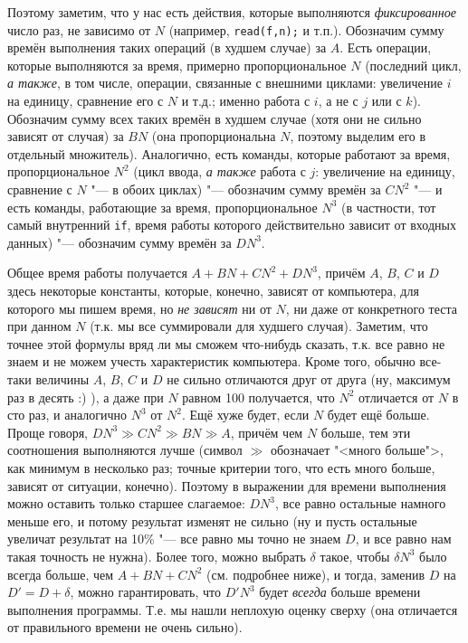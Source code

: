 {Поэтому заметим, что у нас есть действия, которые выполняются 
\textit{фиксированное} число раз, не зависимо от $N$ (например, 
\verb|read(f,n);| и т.п.). Обозначим сумму времён выполнения таких операций (в 
худшем случае) за $A$. Есть операции, которые выполняются за время, примерно 
пропорциональное $N$ (последний цикл, \textit{а также}, в том числе, операции, 
связанные с внешними циклами: увеличение $i$ на единицу, сравнение его с $N$ и 
т.д.; именно работа с $i$, а не с $j$ или с $k$). Обозначим сумму всех таких 
времён в худшем случае (хотя они не сильно зависят от случая) за $BN$ (она 
пропорциональна $N$, поэтому выделим его в отдельный множитель). Аналогично, 
есть команды, которые работают за время, пропорциональное $N^2$ (цикл ввода, 
\textit{а также} работа с $j$: увеличение на единицу, сравнение с $N$ "--- в 
обоих циклах) "--- обозначим сумму времён за $CN^2$ "--- и есть команды, 
работающие за время, пропорциональное $N^3$ (в частности, тот самый внутренний 
\verb|if|, время работы которого действительно зависит от входных данных) "--- 
обозначим сумму времён за $DN^3$.

Общее время работы получается $A+BN+CN^2+DN^3$, причём $A$, $B$, $C$ и $D$ 
здесь некоторые константы, которые, конечно, зависят от компьютера, для 
которого мы пишем время, но \textit{не зависят} ни от $N$, ни даже от 
конкретного теста при данном $N$ (т.к. мы все суммировали для худшего случая). 
Заметим, что точнее этой формулы вряд ли мы сможем что-нибудь сказать, т.к. все 
равно не знаем и не можем учесть характеристик компьютера. Кроме того, обычно 
все-таки величины $A$, $B$, $C$ и $D$ не сильно отличаются друг от друга (ну, 
максимум раз в десять :) ), а даже при $N$ равном 100 получается, что $N^2$ 
отличается от $N$ в сто раз, и аналогично $N^3$ от $N^2$. Ещё хуже будет, если 
$N$ будет ещё больше. Проще говоря, $DN^3\gg CN^2\gg BN \gg A$, причём чем $N$ 
больше, тем эти соотношения выполняются лучше (символ $\gg$ обозначает "<много 
больше">, как минимум в несколько раз; точные критерии того, что есть много 
больше, зависят от ситуации,  
конечно). Поэтому в выражении для времени выполнения можно оставить только 
старшее слагаемое: $DN^3$, все равно остальные намного меньше его, и потому 
результат изменят не сильно (ну и пусть остальные увеличат результат на 10\% 
"--- все равно мы точно не знаем $D$, и все равно нам такая точность не нужна). 
Более того, можно выбрать $\delta$ такое, чтобы $\delta N^3$ было всегда 
больше, чем $A+BN+CN^2$ (см. подробнее ниже), и тогда, заменив $D$ на 
$D'=D+\delta$, можно гарантировать, что $D'N^3$ будет \textit{всегда} больше 
времени выполнения программы. Т.е. мы нашли неплохую оценку сверху (она 
отличается от правильного времени не очень сильно).

}
